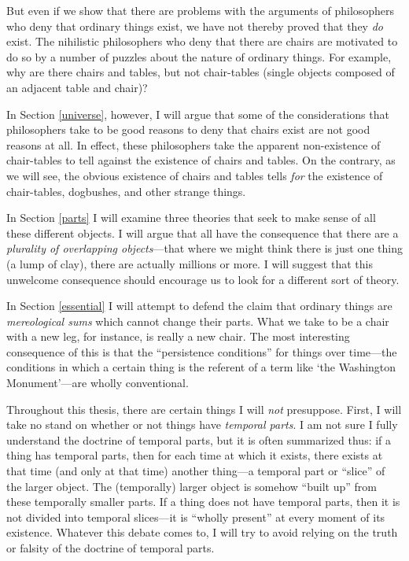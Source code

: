 \documentclass[12pt,twoside]{reedfancy}
\begin{document}
\begin{spacing}{1.25}
But even if we show that there are problems with the arguments of
philosophers who deny that ordinary things exist, we have not thereby
proved that they {\em do} exist.  The nihilistic philosophers who deny
that there are chairs are motivated to do so by a number of puzzles
about the nature of ordinary things.  For example, why are there
chairs and tables, but not chair-tables (single objects composed of an
adjacent table and chair)?

In Section \ref{universe}, however, I will argue that some of the
considerations that philosophers take to be good reasons to deny that
chairs exist are not good reasons at all.  In effect, these
philosophers take the apparent non-existence of chair-tables to tell
against the existence of chairs and tables.  On the contrary, as we
will see, the obvious existence of chairs and tables tells {\em for}
the existence of chair-tables, dogbushes, and other strange things.

In Section \ref{parts} I will examine three theories that seek to make
sense of all these different objects.  I will argue that all have the
consequence that there are a {\em plurality of overlapping
  objects}---that where we might think there is just one thing (a lump
of clay), there are actually millions or more.  I will suggest that
this unwelcome consequence should encourage us to look for a different
sort of theory.

In Section \ref{essential} I will attempt to defend the claim that
ordinary things are {\em mereological sums} which cannot change their
parts.  What we take to be a chair with a new leg, for instance, is
really a new chair.  The most interesting consequence of this is that
the ``persistence conditions'' for things over time---the conditions
in which a certain thing is the referent of a term like `the
Washington Monument'---are wholly conventional.

Throughout this thesis, there are certain things I will {\em not}
presuppose.  First, I will take no stand on whether or not things have
{\em temporal parts}.  I am not sure I fully understand the doctrine
of temporal parts, but it is often summarized thus: if a thing has
temporal parts, then for each time at which it exists, there exists at
that time (and only at that time) another thing---a temporal part or
``slice'' of the larger object.  The (temporally) larger object is
somehow ``built up'' from these temporally smaller parts.  If a thing
does not have temporal parts, then it is not divided into temporal
slices---it is ``wholly present'' at every moment of its existence.
Whatever this debate comes to, I will try to avoid relying on the
truth or falsity of the doctrine of temporal parts.


\end{spacing}
\end{document}
